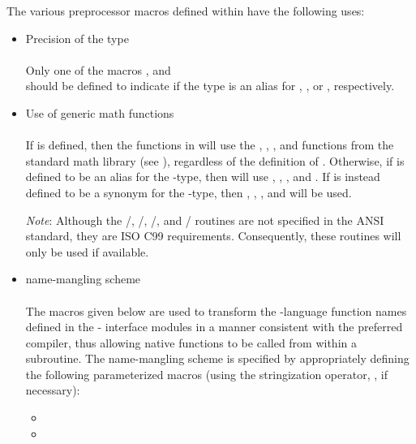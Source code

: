 The various preprocessor macros defined within 
have the following uses:
\begin{itemize}

\item Precision of the {\sundials}  type\\ \\
  Only one of the macros ,
   and \\
   should be defined to indicate if the {\sundials}
   type is an alias for , , or ,
  respectively.

\item Use of generic math functions\\ \\
  If  is defined, then the functions
  in  will use the , ,
  , and  functions from the standard math library
  (see ), regardless of the definition of .
  Otherwise, if  is defined to be an alias for the
   {\C}-type, then {\sundials} will use ,
  , , and .  If  is instead
  defined to be a synonym for the  {\C}-type, then
  , , , and  will be used.

  {\em Note}: Although the /, /,
  /, and / routines are not
  specified in the ANSI {\C} standard, they are ISO C99 requirements.
  Consequently, these routines will only be used if available.

\item {\F} name-mangling scheme\\ \\
  The macros given below are used to transform the {\C}-language
  function names defined in the {\F}-{\C} interface modules in a manner
  consistent with the preferred {\F} compiler, thus allowing native
  {\C} functions to be called from within a {\F} subroutine. The
  name-mangling scheme is specified by appropriately defining
  the following parameterized macros (using the stringization operator,
  \id{\#\#}, if necessary):
  \begin{itemize}
  \item {}
  \item {}
  \end{itemize}


\end{itemize}

